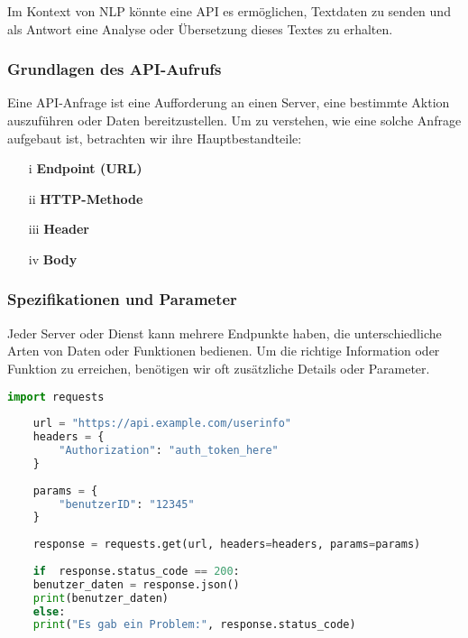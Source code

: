 \documentclass[12pt,a4paper]{article}
\begin{document}
\begin{center}
\end{center}

Im Kontext von NLP könnte eine API es ermöglichen, Textdaten zu senden und als Antwort eine Analyse oder Übersetzung dieses Textes zu erhalten.

\subsubsection{Grundlagen des API-Aufrufs}
Eine API-Anfrage ist eine Aufforderung an einen Server, eine bestimmte Aktion auszuführen oder Daten bereitzustellen. Um zu verstehen, wie eine solche Anfrage aufgebaut ist, betrachten wir ihre Hauptbestandteile:
\begin{enumerate}
	\item[i] \textbf{Endpoint (URL)}
	\item[ii] \textbf{HTTP-Methode}
	\item[iii]  \textbf{Header}
	\item[iv]  \textbf{Body}
\end{enumerate}

\subsubsection{Spezifikationen und Parameter}
Jeder Server oder Dienst kann mehrere Endpunkte haben, die unterschiedliche Arten von Daten oder Funktionen bedienen. Um die richtige Information oder Funktion zu erreichen, benötigen wir oft zusätzliche Details oder Parameter.

\begin{lstlisting}[language=Python, numbers = none]
	import requests
	
	url = "https://api.example.com/userinfo"
	headers = {
		"Authorization": "auth_token_here"
	}
	
	params = {
		"benutzerID": "12345"
	}
	
	response = requests.get(url, headers=headers, params=params)
	
	if  response.status_code == 200:
	benutzer_daten = response.json()
	print(benutzer_daten)
	else:
	print("Es gab ein Problem:", response.status_code)
\end{lstlisting}
\end{document}
